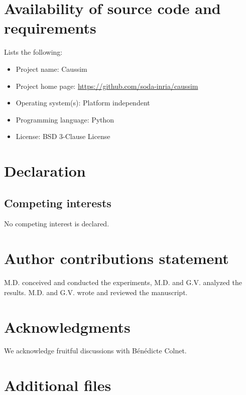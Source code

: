 \documentclass[a4paper,num-refs]{oup-contemporary}%
\begin{document}


\section{Availability of source code and requirements}

Lists the following:
\begin{itemize}
    \item Project name: Caussim
    \item Project home page: \url{https://github.com/soda-inria/caussim}
    \item Operating system(s): Platform independent
    \item Programming language: Python
    \item License: BSD 3-Clause License
\end{itemize}


\section{Declaration}
\subsection{Competing interests}
No competing interest is declared.

\section{Author contributions statement}

M.D. conceived and conducted the experiments, M.D. and G.V. analyzed the results. M.D. and G.V. wrote and reviewed the manuscript.

\section{Acknowledgments}

We acknowledge fruitful discussions with Bénédicte Colnet.

\clearpage

\onecolumn
\setcounter{secnumdepth}{2}


\appendix
\section{Additional files}
\end{document}
